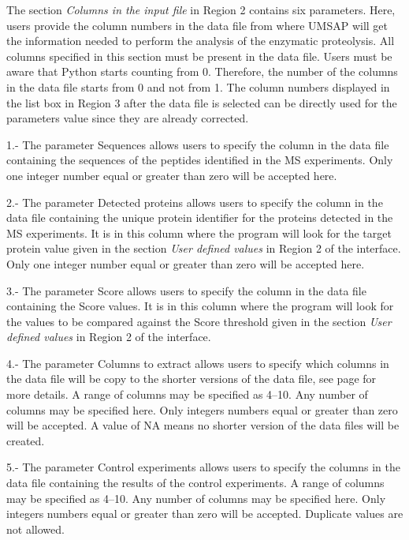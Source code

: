 The section \textit{Columns in the input file} in Region \num{2} contains six parameters. Here, users provide the column numbers in the data file from where UMSAP will get the information needed to perform the analysis of the enzymatic proteolysis. All columns specified  in this section must be present in the data file. Users must be aware that Python starts counting from \num{0}. Therefore, the number of the columns in the data file starts from \num{0} and not from \num{1}. The column numbers displayed in the list box in Region \num{3} after the data file is selected can be directly used for the parameters value since they are already corrected.  

\num{1}.- The parameter Sequences allows users to specify the column in the data file containing the sequences of the peptides identified in the MS experiments. Only one integer number equal or greater than zero will be accepted here.

\num{2}.- The parameter Detected proteins allows users to specify the column in the data file containing the unique protein identifier for the proteins detected in the MS experiments. It is in this column where the program will look for the target protein value given in the section \textit{User defined values} in Region \num{2} of the interface. Only one integer number equal or greater than zero will be accepted here.

\num{3}.- The parameter Score allows users to specify the column in the data file containing the Score values. It is in this column where the program will look for the values to be compared against the Score threshold given in the section \textit{User defined values} in Region \num{2} of the interface.

\num{4}.- The parameter Columns to extract\label{par:enzdigColExt} allows users to specify which columns in the data file will be copy to the shorter versions of the data file, see page \pageref{par:datafilesenzdig} for more details. A range of columns may be specified as \numrange[range-phrase = --]{4}{10}. Any number of columns may be specified here. Only integers numbers equal or greater than zero will be accepted. A value of NA means no shorter version of the data files will be created.

\num{5}.- The parameter Control experiments allows users to specify the columns in the data file containing the results of the control experiments. A range of columns may be specified as \numrange[range-phrase = --]{4}{10}. Any number of columns may be specified here. Only integers numbers equal or greater than zero will be accepted. Duplicate values are not allowed.

